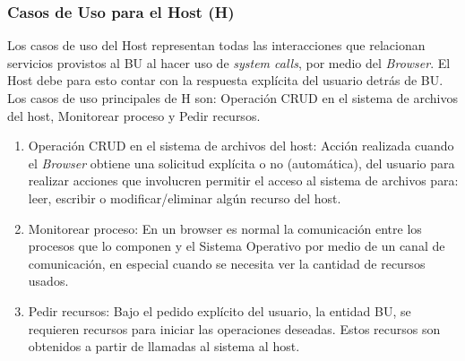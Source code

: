 \subsubsection{Casos de Uso para el Host (H)}
Los casos de uso del Host representan todas las interacciones que relacionan servicios provistos al BU al hacer uso de \textit{system calls}, por medio del \textit{Browser}. El Host debe para esto contar con la respuesta explícita del usuario detrás de BU. Los casos de uso principales de H son: Operación CRUD en el sistema de archivos del host, Monitorear proceso y Pedir recursos.
			\begin{enumerate}
				\item Operación CRUD en el sistema de archivos del host: Acción realizada cuando el \textit{Browser} obtiene una solicitud explícita o no (automática), del usuario para realizar acciones que involucren permitir el acceso al sistema de archivos para: leer, escribir o modificar/eliminar algún recurso del host.

				\item Monitorear proceso: En un browser es normal la comunicación entre los procesos que lo componen y el Sistema Operativo por medio de un canal de comunicación, en especial cuando se necesita ver la cantidad de recursos usados.

				\item Pedir recursos: Bajo el pedido explícito del usuario, la entidad BU, se requieren recursos para iniciar las operaciones deseadas. Estos recursos son obtenidos a partir de llamadas al sistema al host.
			\end{enumerate}

